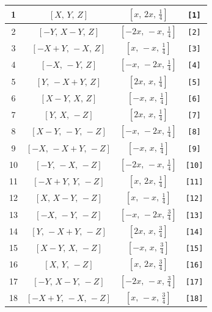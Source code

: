 \documentclass[fleqn,8pt]{jsarticle}
\begin{document}
\begin{longtable}{cccc}
1 & $\left[ X,\, Y,\, Z \right]$ & $\left[ x,\, 2 x,\, \frac{1}{4} \right]$ & {\tt [1]} \\ \hline
2 & $\left[ - Y,\, X - Y,\, Z \right]$ & $\left[ - 2 x,\, - x,\, \frac{1}{4} \right]$ & {\tt [2]} \\ \hline
3 & $\left[ - X + Y,\, - X,\, Z \right]$ & $\left[ x,\, - x,\, \frac{1}{4} \right]$ & {\tt [3]} \\ \hline
4 & $\left[ - X,\, - Y,\, Z \right]$ & $\left[ - x,\, - 2 x,\, \frac{1}{4} \right]$ & {\tt [4]} \\ \hline
5 & $\left[ Y,\, - X + Y,\, Z \right]$ & $\left[ 2 x,\, x,\, \frac{1}{4} \right]$ & {\tt [5]} \\ \hline
6 & $\left[ X - Y,\, X,\, Z \right]$ & $\left[ - x,\, x,\, \frac{1}{4} \right]$ & {\tt [6]} \\ \hline
7 & $\left[ Y,\, X,\, - Z \right]$ & $\left[ 2 x,\, x,\, \frac{1}{4} \right]$ & {\tt [7]} \\ \hline
8 & $\left[ X - Y,\, - Y,\, - Z \right]$ & $\left[ - x,\, - 2 x,\, \frac{1}{4} \right]$ & {\tt [8]} \\ \hline
9 & $\left[ - X,\, - X + Y,\, - Z \right]$ & $\left[ - x,\, x,\, \frac{1}{4} \right]$ & {\tt [9]} \\ \hline
10 & $\left[ - Y,\, - X,\, - Z \right]$ & $\left[ - 2 x,\, - x,\, \frac{1}{4} \right]$ & {\tt [10]} \\ \hline
11 & $\left[ - X + Y,\, Y,\, - Z \right]$ & $\left[ x,\, 2 x,\, \frac{1}{4} \right]$ & {\tt [11]} \\ \hline
12 & $\left[ X,\, X - Y,\, - Z \right]$ & $\left[ x,\, - x,\, \frac{1}{4} \right]$ & {\tt [12]} \\ \hline
13 & $\left[ - X,\, - Y,\, - Z \right]$ & $\left[ - x,\, - 2 x,\, \frac{3}{4} \right]$ & {\tt [13]} \\ \hline
14 & $\left[ Y,\, - X + Y,\, - Z \right]$ & $\left[ 2 x,\, x,\, \frac{3}{4} \right]$ & {\tt [14]} \\ \hline
15 & $\left[ X - Y,\, X,\, - Z \right]$ & $\left[ - x,\, x,\, \frac{3}{4} \right]$ & {\tt [15]} \\ \hline
16 & $\left[ X,\, Y,\, - Z \right]$ & $\left[ x,\, 2 x,\, \frac{3}{4} \right]$ & {\tt [16]} \\ \hline
17 & $\left[ - Y,\, X - Y,\, - Z \right]$ & $\left[ - 2 x,\, - x,\, \frac{3}{4} \right]$ & {\tt [17]} \\ \hline
18 & $\left[ - X + Y,\, - X,\, - Z \right]$ & $\left[ x,\, - x,\, \frac{3}{4} \right]$ & {\tt [18]} \\ \hline

\end{longtable}
\end{document}
